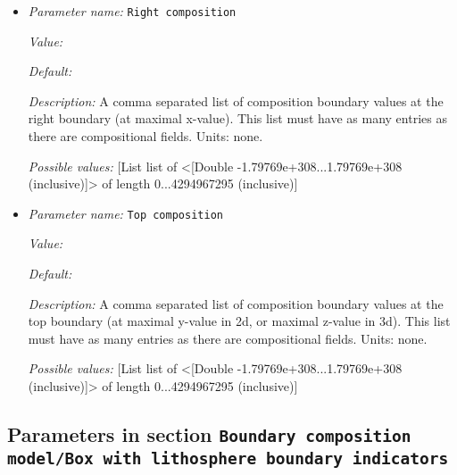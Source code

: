 \begin{itemize}
{\it Value:} 


{\it Default:} 


{\it Description:} A comma separated list of composition boundary values at the left boundary (at minimal x-value). This list must have as many entries as there are compositional fields. Units: none.


{\it Possible values:} [List list of <[Double -1.79769e+308...1.79769e+308 (inclusive)]> of length 0...4294967295 (inclusive)]
\item {\it Parameter name:} {\tt Right composition}
\label{parameters:Boundary composition model/Box/Right composition}


{\it Value:} 


{\it Default:} 


{\it Description:} A comma separated list of composition boundary values at the right boundary (at maximal x-value). This list must have as many entries as there are compositional fields. Units: none.


{\it Possible values:} [List list of <[Double -1.79769e+308...1.79769e+308 (inclusive)]> of length 0...4294967295 (inclusive)]
\item {\it Parameter name:} {\tt Top composition}
\label{parameters:Boundary composition model/Box/Top composition}


{\it Value:} 


{\it Default:} 


{\it Description:} A comma separated list of composition boundary values at the top boundary (at maximal y-value in 2d, or maximal z-value in 3d). This list must have as many entries as there are compositional fields. Units: none.


{\it Possible values:} [List list of <[Double -1.79769e+308...1.79769e+308 (inclusive)]> of length 0...4294967295 (inclusive)]
\end{itemize}

\subsection{Parameters in section \tt Boundary composition model/Box with lithosphere boundary indicators}
\label{parameters:Boundary_20composition_20model/Box_20with_20lithosphere_20boundary_20indicators}

